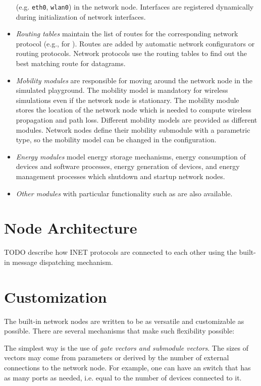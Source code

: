 \begin{itemize}
     (e.g. \texttt{eth0}, \texttt{wlan0}) in the network node. Interfaces
     are registered dynamically during initialization of network interfaces.
  \item \emph{Routing tables} maintain the list of routes for the corresponding
     network protocol (e.g.,  for ).
     Routes are added by automatic network configurators or routing protocols.
     Network protocols use the routing tables to find out the best matching
     route for datagrams.
  \item \emph{Mobility modules} are responsible for moving around the network
     node in the simulated playground. The mobility model is mandatory for
     wireless simulations even if the network node is stationary. The mobility
     module stores the location of the network node which is needed to compute
     wireless propagation and path loss. Different mobility models are provided
     as different modules. Network nodes define their mobility submodule with
     a parametric type, so the mobility model can be changed in the configuration.
  \item \emph{Energy modules} model energy storage mechanisms, energy
     consumption of devices and software processes, energy generation of devices,
     and energy management processes which shutdown and startup network nodes.
  \item \emph{Other modules} with particular functionality such as
      are also available.
\end{itemize}

\section{Node Architecture}

TODO describe how INET protocols are connected to each other using the built-in message dispatching mechanism.

\section{Customization}

The built-in network nodes are written to be as versatile and customizable
as possible. There are several mechanisms that make such flexibility possible:

The simplest way is the use of \textit{gate vectors and submodule vectors}. The
sizes of vectors may come from parameters or derived by the number of
external connections to the network node. For example, one can have an
 switch that has as many ports as needed, i.e. equal to
the number of  devices connected to it.

